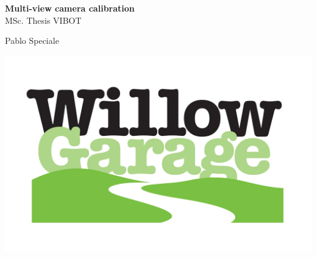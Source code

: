 
\newpage
\thispagestyle{empty}


\vspace*{1cm}
\begin{center}
\huge{\bf Multi-view camera calibration} \\[0.5cm]
{\Large MSc. Thesis VIBOT\\} \vspace{2cm} {\large
Pablo Speciale\\
\vspace{1cm}

\includegraphics[height=0.20\textheight]{images/WG_logo_on_white.jpg}
}
\end{center}

